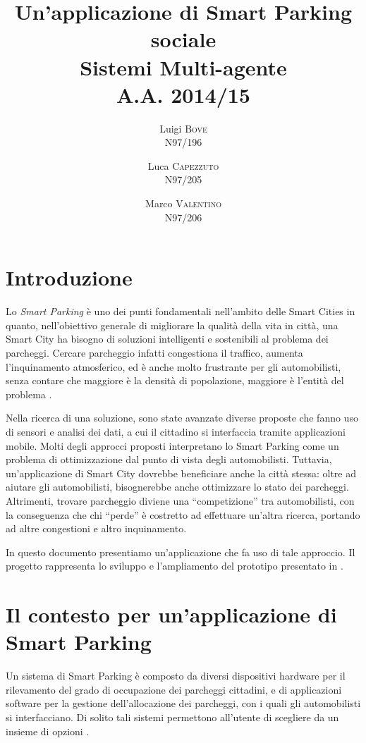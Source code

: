 \documentclass[11pt,a4paper,twoside]{article}
\title{
    Un'applicazione di Smart Parking sociale\\
    \vspace{.5cm}
    \large Sistemi Multi-agente\\
    \vspace{.5cm}
    \normalsize {\fontsize{10}{12}\selectfont A.A.} 2014/15
    \vspace{.25cm}
}
\author{
    Luigi \textsc{Bove}\\
    {\fontsize{11.25}{13.5}\selectfont N}97/196
    \and
    Luca \textsc{Capezzuto}\\
    {\fontsize{11.25}{13.5}\selectfont N}97/205
    \and
    Marco \textsc{Valentino}\\
    {\fontsize{11.25}{13.5}\selectfont N}97/206
}
\date{}
\numberwithin{figure}{section}
\numberwithin{equation}{section}
\begin{document}
\maketitle
\thispagestyle{empty}
\newpage

\section{Introduzione}

Lo \emph{Smart Parking} è uno dei punti fondamentali nell'ambito delle Smart Cities in quanto, nell'obiettivo generale di migliorare la qualità della vita in città, una Smart City ha bisogno di soluzioni intelligenti e sostenibili al problema dei parcheggi.
Cercare parcheggio infatti congestiona il traffico, aumenta l'inquinamento atmosferico, ed è anche molto frustrante per gli automobilisti, senza contare che maggiore è la densità di popolazione, maggiore è l'entità del problema \cite{1}.

Nella ricerca di una soluzione, sono state avanzate diverse proposte che fanno uso di sensori e analisi dei dati, a cui il cittadino si interfaccia tramite applicazioni mobile.
Molti degli approcci proposti interpretano lo Smart Parking come un problema di ottimizzazione dal punto di vista degli automobilisti. Tuttavia, un'applicazione di Smart City dovrebbe beneficiare anche la città stessa: oltre ad aiutare gli automobilisti, bisognerebbe anche ottimizzare lo stato dei parcheggi. Altrimenti, trovare parcheggio diviene una ``competizione'' tra automobilisti, con la conseguenza che chi ``perde'' è costretto ad effettuare un'altra ricerca, portando ad altre congestioni e altro inquinamento.

In questo documento presentiamo un'applicazione che fa uso di tale approccio.
Il progetto rappresenta lo sviluppo e l'ampliamento del prototipo presentato in \cite{2}.

\section{Il contesto per un'applicazione di Smart Parking}

Un sistema di Smart Parking è composto da diversi dispositivi hardware per il rilevamento del grado di occupazione dei parcheggi cittadini, e di applicazioni software per la gestione dell'allocazione dei parcheggi, con i quali gli automobilisti si interfacciano.
Di solito tali sistemi permettono all'utente di scegliere da un insieme di opzioni \cite{3}.
\end{document}
